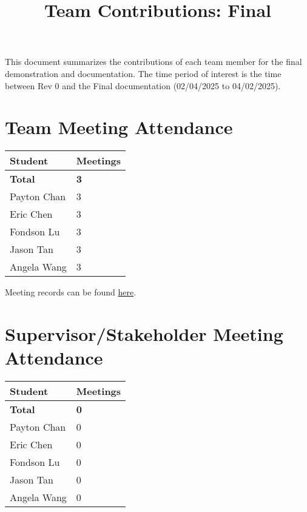 \documentclass{article}
\title{Team Contributions: Final\\\progname}
\author{\authname}
\date{}
\begin{document}
\maketitle

This document summarizes the contributions of each team member for the final
demonstration and documentation.  The time period of interest is the time
between Rev 0 and the Final documentation (02/04/2025 to 04/02/2025).

\section{Team Meeting Attendance}


\begin{table}[H]
    \centering
    \begin{tabular}{ll}
    \toprule
    \textbf{Student} & \textbf{Meetings}\\
    \midrule
    \textbf{Total} & \textbf{3}\\
    Payton Chan & 3\\
    Eric Chen & 3\\
    Fondson Lu & 3\\
    Jason Tan & 3\\
    Angela Wang & 3\\
    \bottomrule
    \end{tabular}
\end{table}

Meeting records can be found
\href{https://github.com/PlutosCapstone/Plutos/issues?q=label%3Ameeting%20is%3Aclosed%20}{here}.

\section{Supervisor/Stakeholder Meeting Attendance}

\begin{table}[H]
    \centering
    \begin{tabular}{ll}
    \toprule
    \textbf{Student} & \textbf{Meetings}\\
    \midrule
    \textbf{Total} & \textbf{0}\\
    Payton Chan & 0\\
    Eric Chen & 0\\
    Fondson Lu & 0\\
    Jason Tan & 0\\
    Angela Wang & 0\\
    \bottomrule
    \end{tabular}
    \end{table}
    
\end{document}

